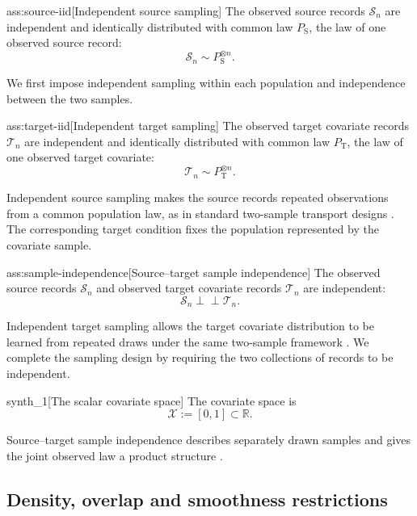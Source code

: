 \begin{assumptionv}{ass:source-iid}[Independent source sampling]
The observed source records \(\mathcal S_n\) are independent and identically distributed with common law \(P_{\mathrm S}\), the law of one observed source record:
\[
\mathcal S_n\sim P_{\mathrm S}^{\otimes n}.
\]
\end{assumptionv}

We first impose independent sampling within each population and independence between the two samples.

\begin{assumptionv}{ass:target-iid}[Independent target sampling]
The observed target covariate records \(\mathcal T_n\) are independent and identically distributed with common law \(P_{\mathrm T}\), the law of one observed target covariate:
\[
\mathcal T_n\sim P_{\mathrm T}^{\otimes n}.
\]
\end{assumptionv}

Independent source sampling makes the source records repeated observations from a common population law, as in standard two-sample transport designs \citep{ZengKennedyBodnarNaimi2025Efficient}. The corresponding target condition fixes the population represented by the covariate sample.

\begin{assumptionv}{ass:sample-independence}[Source–target sample independence]
The observed source records \(\mathcal S_n\) and observed target covariate records \(\mathcal T_n\) are independent:
\[
\mathcal S_n\perp\!\!\!\perp\mathcal T_n.
\]
\end{assumptionv}

Independent target sampling allows the target covariate distribution to be learned from repeated draws under the same two-sample framework \citep{ZengKennedyBodnarNaimi2025Efficient}. We complete the sampling design by requiring the two collections of records to be independent.

\begin{definitionv}{synth_1}[The scalar covariate space]
The covariate space is
\[
\mathcal X := [0,1] \subset \mathbb R.
\]
\end{definitionv}

Source–target sample independence describes separately drawn samples and gives the joint observed law a product structure \citep{ZengKennedyBodnarNaimi2025Efficient}.

\subsection{Density, overlap and smoothness restrictions}

